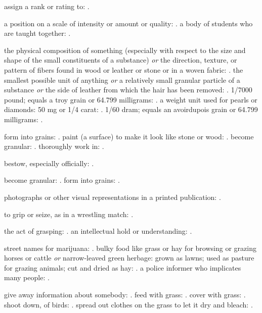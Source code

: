   assign a rank or rating to: .

  a position on a scale of intensity or amount or quality: . a body of students who are taught together: .

  the physical composition of something (especially with respect to the size and shape of the small constituents of a substance) \textit{or} the direction, texture, or pattern of fibers found in wood or leather or stone or in a woven fabric: . the smallest possible unit of anything \textit{or} a relatively small granular particle of a substance \textit{or} the side of leather from which the hair has been removed: . 1/7000 pound; equals a troy grain or 64.799 milligrams: . a weight unit used for pearls or diamonds: 50 mg or 1/4 carat: . 1/60 dram; equals an avoirdupois grain or 64.799 milligrams: .

  form into grains: . paint (a surface) to make it look like stone or wood: . become granular: . thoroughly work in: .

  bestow, especially officially: .

  become granular: . form into grains: .

  photographs or other visual representations in a printed publication: .

  to grip or seize, as in a wrestling match: .

  the act of grasping: . an intellectual hold or understanding: .

  street names for marijuana: . bulky food like grass or hay for browsing or grazing horses or cattle \textit{or} narrow-leaved green herbage: grown as lawns; used as pasture for grazing animals; cut and dried as hay: . a police informer who implicates many people: .

  give away information about somebody: . feed with grass: . cover with grass: . shoot down, of birds: . spread out clothes on the grass to let it dry and bleach: .


